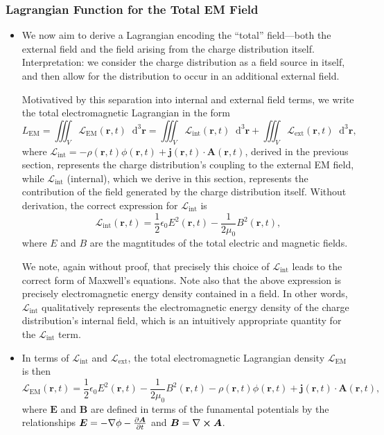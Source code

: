 \documentclass[11pt, a4paper]{article}
\newcommand{\diff}{\mathop{}\!\mathrm{d}} %
\newcommand{\dr}{\diff^{3} \r}  %
\renewcommand{\L}{\mathcal{L}}  %
\renewcommand{\vec}[1]{\bm{#1}} %
\renewcommand{\r}{\vec{r}}
\newcommand{\E}{\vec{E}} %
\newcommand{\B}{\vec{B}} %
\newcommand{\A}{\vec{A}} %
\newcommand{\ee}{\epsilon_{0}}  %
\newcommand{\mm}{\mu_{0}}  %
\renewcommand{\j}{\vec{j}}  %
\renewcommand{\curl}{\nabla \cross}
\renewcommand{\grad}{\nabla}
\begin{document}
\subsubsection{Lagrangian Function for the Total EM Field}
\begin{itemize}
	\item We now aim to derive a Lagrangian encoding the ``total'' field---both the external field and the field arising from the charge distribution itself. Interpretation: we consider the charge distribution as a field source in itself, and then allow for the distribution to occur in an additional external field.
	
	Motivatived by this separation into internal and external field terms, we write the total electromagnetic Lagrangian in the form
	\begin{equation*}
		L_{\text{EM}} = \iiint_{V} \L_{\text{EM}}(\r, t) \dr = \iiint_{V} \L_{\text{int}}(\r, t) \dr + \iiint_{V} \L_{\text{ext}}(\r, t)\dr,
	\end{equation*}
    where $ \L_{\text{int}} = - \rho(\r, t) \phi(\r, t) + \j(\r, t)\cdot \A(\r, t) $, derived in the previous section, represents the charge distribution's coupling to the external EM field, while $ \L_{\text{int}} $ (internal), which we derive in this section, represents the contribution of the field generated by the charge distribution itself. Without derivation, the correct expression for $ \L_{\text{int}} $ is
	\begin{equation*}
		\L_{\text{int}}(\r, t) = \frac{1}{2}\ee E^{2}(\r, t) - \frac{1}{2\mm}B^{2}(\r, t),
	\end{equation*}
    where $ E $ and $ B $ are the magntitudes of the total electric and magnetic fields.
    
	We note, again without proof, that precisely this choice of $ \L_{\text{int}} $ leads to the correct form of Maxwell's equations. Note also that the above expression is precisely electromagnetic energy density contained in a field. In other words, $ \L_{\text{int}} $ qualitatively represents the electromagnetic energy density of the charge distribution's internal field, which is an intuitively appropriate quantity for the $ \L_{\text{int}} $ term.
	
	\item In terms of $ \L_{\text{int}} $ and $ \L_{\text{ext}} $, the total electromagnetic Lagrangian density $ \L_{\text{EM}} $ is then
	\begin{equation*}
		\L_{\text{EM}}(\r, t) = \frac{1}{2}\ee E^{2}(\r, t) - \frac{1}{2\mm}B^{2}(\r, t) - \rho(\r, t)\phi(\r, t) + \j(\r, t) \cdot \A(\r, t),
	\end{equation*}
	where $ \E $ and $ \B $ are defined in terms of the funamental potentials by the relationships $ \E = - \grad \phi - \pdv{\A}{t} $ and $ \B = \curl \A $.
\end{itemize}
\end{document}
